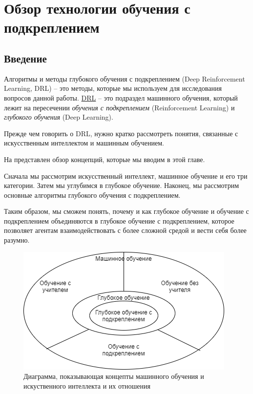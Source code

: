 \chapter{Обзор технологии обучения с подкреплением} \label{ch1}

\section{Введение} \label{ch1:intro}

Алгоритмы и методы глубокого обучения с подкреплением (Deep Reinforcement Learning, DRL) – это методы, которые мы используем для исследования вопросов данной работы. \hyperref[acr:drl]{DRL} – это подраздел машинного обучения, который лежит на пересечении \textit{обучения с подкреплением} (Reinforcement Learning) и \textit{глубокого обучения} (Deep Learning).

Прежде чем говорить о DRL, нужно кратко рассмотреть понятия, связанные с искусственным интеллектом и машинным обучением.

На  представлен обзор концепций, которые мы вводим в этой главе. 

Сначала мы рассмотрим искусственный интеллект, машинное обучение и его три категории. Затем мы углубимся в глубокое обучение. Наконец, мы рассмотрим основные алгоритмы глубокого обучения с подкреплением.

Таким образом, мы сможем понять, почему и как глубокое обучение и обучение с подкреплением объединяются в глубокое обучение с подкреплением, которое позволяет агентам взаимодействовать с более сложной средой и вести себя более разумно.

\begin{figure}[ht!] 
	\center
	\includegraphics [scale=0.80] {my_folder/images/ch1/ML-and-AI-concepts.png}
	\caption{Диаграмма, показывающая концепты машинного обучения и искуственного интеллекта и их отношения} 
	\label{fig:ch1-ML-and-AI-concepts}  
\end{figure}

